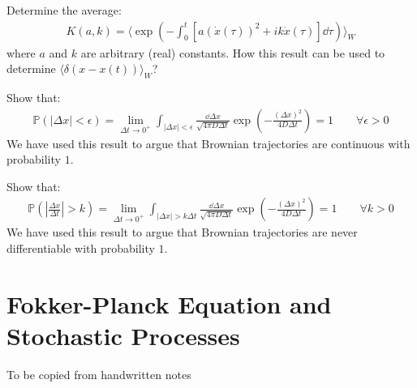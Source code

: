 \documentclass[../template.tex]{subfiles}
\begin{document}
\begin{exo}
    Determine the average:
    \begin{align*}
        K(a,k) = \langle \exp\left(-\int_0^t [a(\dot{x}(\tau))^2 + ik \dot{x}(\tau)]\dd{\tau}\right) \rangle_W 
    \end{align*}
    where $a$ and $k$ are arbitrary (real) constants. How this result can be used to determine $\langle \delta(x-x(t)) \rangle_W$?
\end{exo}

\begin{exo}
    Show that:
    \begin{align*}
        \mathbb{P}(|\Delta x| < \epsilon) = \lim_{\Delta t \to 0^+} \int_{|\Delta x| < \epsilon } \frac{\dd{\Delta x}}{\sqrt{4 \pi D \Delta t }} \exp\left(-\frac{(\Delta x)^2}{4D \Delta t} \right)=1 \qquad \forall \epsilon> 0 
    \end{align*}
    We have used this result to argue that Brownian trajectories are continuous with probability $1$.
\end{exo}

\begin{exo}
    Show that:
    \begin{align*}
        \mathbb{P}\left(\left|\frac{\Delta x}{\Delta t}  \right| > k\right) = \lim_{\Delta t \to 0^+} \int_{|\Delta x| > k \Delta t} \frac{\dd{\Delta x }}{\sqrt{4 \pi D \Delta t}}\exp\left(-\frac{(\Delta x)^2}{4 D \Delta t} \right) = 1 \qquad \forall k > 0
    \end{align*}
    We have used this result to argue that Brownian trajectories are never differentiable with probability $1$.
\end{exo}

\setcounter{chapter}{3}
\chapter{Fokker-Planck Equation and Stochastic Processes}
To be copied from handwritten notes
\end{document}
